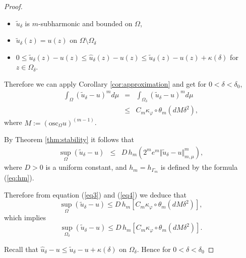 \documentclass[12pt]{amsart}
\theoremstyle{definition}
\numberwithin{theorem}{section}
\numberwithin{equation}{section}
\begin{document}
{\begin{proof}
\begin{itemize}
\item $\tilde{u}_{\delta}$ is  $m$-subharmonic and bounded on $\Omega$,
\item $\tilde{u}_{\delta}(z) = u (z)$ on $\Omega \setminus \Omega_\delta$
\item $0 \leq \tilde{u}_{\delta}(z) - u (z) \leq  \widehat{u}_\delta  (z) - u (z) \leq \tilde{u}_{\delta}(z) - u (z) + \kappa (\delta) $ for $z\in \Omega_{\delta}$.
\end{itemize}

Therefore we can apply Corollary \ref{cor:approximation} and get for $0<\delta<\delta_0$,
\begin{eqnarray} \label{eq3}
\int_{\Omega}(\tilde{u}_{\delta}-u)^m d\mu & = &   \int_{\Omega_\delta}(\tilde{u}_{\delta}-u)^m d\mu \nonumber \\
  &\leq& C_m \kappa_\varphi \circ \theta_m \left(d M \delta^{2}\right),
\end{eqnarray}
where    $M := \left(\mathrm{osc}_\Omega u\right)^{(m - 1)}$.
 
  By Theorem \ref{thm:stability} it follows that 
 \begin{eqnarray} \label{eq4}
\sup_{\Omega}(\tilde{u}_{\delta}-u)
 & \leq & D \,  h_{m} (2^m e^m \Vert \tilde u_\delta - u\Vert_{m,\mu}^m), 
 \end{eqnarray}
 where $D >0$ is a uniform constant,  and $h_m =  h_{\Gamma_m} $ is defined by the formula (\ref{eq:hm}).
 

 Therefore  from equation  (\ref{eq3}) and (\ref{eq4}) we deduce that
 \begin{equation*} 
\sup_{\Omega}( \tilde{u}_{\delta}-u)  \leq    D \, h_m \left[C_m \kappa_\varphi \circ \theta_m \left(d M \delta^{2}\right)\right], 
 \end{equation*}
 which implies
 \begin{equation} \label{eq:Finaleq}
 \sup_{\Omega_{\delta}}( \tilde{u}_{\delta}-u)  \leq  D  \,   h_m \left[C_m \kappa_\varphi \circ \theta_m  \left( d M \delta^{2} \right)\right].
  \end{equation}
 
 
Recall that $ \hat{u}_{\delta} - u \leq \tilde u_\delta - u + \kappa (\delta) $ on $\Omega_\delta$. Hence  for $0 < \delta < \delta_0$
 

\end{proof}}
\end{document}
